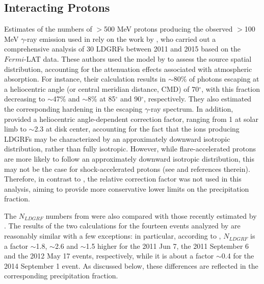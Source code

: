 \documentclass{aastex61}
\begin{document}
\subsection{Interacting Protons}\label{Interacting Protons}
Estimates of the numbers of $>$500 MeV protons producing the observed $>$100 MeV $\gamma$-ray emission used in \citet{ref:DENOLFO2019} rely on the work by \citet{ref:SHARE2018}, who carried out a comprehensive analysis of 30 LDGRFs between 2011 and 2015 based on the $Fermi$-LAT data. These authors used the model by \citet{ref:MURPHY1987} to assess the source spatial distribution, accounting for the attenuation effects associated with atmospheric absorption. For instance, their calculation results in $\sim$80\% of photons escaping at a heliocentric angle (or central meridian distance, CMD) of 70$^{\circ}$, with this fraction decreasing to $\sim$47\% and $\sim$8\% at 85$^{\circ}$ and 90$^{\circ}$, respectively. They also estimated the corresponding hardening in the escaping $\gamma$-ray spectrum. In addition, \citet{ref:SHARE2018} provided a heliocentric angle-dependent correction factor, ranging from 1 at solar limb to $\sim$2.3 at disk center,
accounting for the fact that the ions producing LDGRFs may be characterized by an approximately downward isotropic distribution, rather than fully isotropic.
However, while flare-accelerated protons are more likely to follow an approximately downward isotropic distribution, this may not be the case for shock-accelerated protons (see \citealp{ref:SHARE2018} and references therein). Therefore, in contrast to \citet{ref:DENOLFO2019}, the relative correction factor was not used in this analysis, aiming to provide more conservative lower limits on the precipitation fraction.

The $N_{LDGRF}$ numbers from \citet{ref:SHARE2018} were also compared with those recently estimated by 
\citet{ref:AJELLO2021}. The results of the two calculations for the fourteen events analyzed by \citet{ref:DENOLFO2019} are reasonably similar 
with a few exceptions: in particular, according to \citet{ref:AJELLO2021}, $N_{LDGRF}$ is a factor $\sim$1.8, $\sim$2.6 and $\sim$1.5 higher for the 2011 Jun 7, the 2011 September 6 and the 2012 May 17 events, respectively, while it is about a factor $\sim$0.4 for the 2014 September 1 event. 
As discussed below, these differences
are reflected in the corresponding precipitation fraction. 

%
%
%
%
\end{document}
